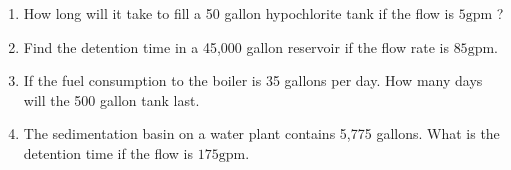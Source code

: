 \documentclass{article}
\begin{document}
\begin{enumerate}

\item How long will it take to fill a 50 gallon hypochlorite tank if the flow is $5 \mathrm{gpm}$ ?

\item Find the detention time in a 45,000 gallon reservoir if the flow rate is $85 \mathrm{gpm}$.

\item If the fuel consumption to the boiler is 35 gallons per day. How many days will the 500 gallon tank last.

\item The sedimentation basin on a water plant contains 5,775 gallons. What is the detention time if the flow is $175 \mathrm{gpm}$.
\end{enumerate}
\end{document}
